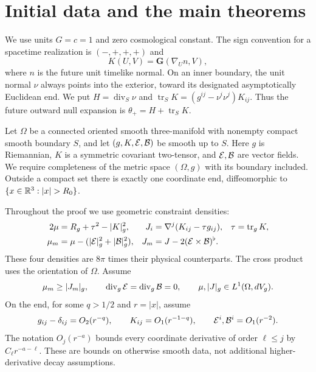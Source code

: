 \section{Initial data and the main theorems}\label{sec:statements}

We use units $G=c=1$ and zero cosmological constant. The sign convention
for a spacetime realization is $(-,+,+,+)$ and
\[
 K(U,V)=\mathbf G(\nabla_U n,V),
\]
where $n$ is the future unit timelike normal. On an inner boundary, the
unit normal $\nu$ always points into the exterior, toward its designated
asymptotically Euclidean end. We put $H=\operatorname{div}_S\nu$ and
$\operatorname{tr}_S K=(g^{ij}-\nu^i\nu^j)K_{ij}$. Thus the future outward
null expansion is $\theta_+=H+\operatorname{tr}_S K$.

\begin{definition}\label{def:data}
Let $\Omega$ be a connected oriented smooth three-manifold with nonempty
compact smooth boundary $S$, and let $(g,K,\mathcal E,\mathcal B)$ be smooth up to $S$.
Here $g$ is Riemannian, $K$ is a symmetric covariant two-tensor, and
$\mathcal E,\mathcal B$ are vector fields. We require completeness of the metric space
$(\Omega,g)$ with its boundary included. Outside a compact set there is
exactly one coordinate end, diffeomorphic to
$\{x\in\R^3:|x|>R_0\}$.

Throughout the proof we use geometric constraint densities:
\begin{align}
 2\mu&=R_g+\tau^2-|K|_g^2, &
 J_i&=\nabla^j(K_{ij}-\tau g_{ij}), &\tau&=\operatorname{tr}_gK,
 \label{eq:constraints}\\
 \mu_m&=\mu-(|\mathcal E|_g^2+|\mathcal B|_g^2), &
 J_m&=J-2(\mathcal E\times\mathcal B)^\flat.&&
 \label{eq:matter}
\end{align}
These four densities are $8\pi$ times their physical counterparts.
The cross product uses the orientation of $\Omega$. Assume
\begin{equation}\label{eq:charged-dec}
 \mu_m\ge |J_m|_g,\qquad
 \operatorname{div}_g\mathcal E=\operatorname{div}_g\mathcal B=0,
 \qquad \mu,|J|_g\in L^1(\Omega,dV_g).
\end{equation}
On the end, for some $q>1/2$ and $r=|x|$, assume
\begin{equation}\label{eq:weak-decay}
 g_{ij}-\delta_{ij}=O_2(r^{-q}),\qquad
 K_{ij}=O_1(r^{-1-q}),\qquad
 \mathcal E^i,\mathcal B^i=O_1(r^{-2}).
\end{equation}
The notation $O_j(r^{-a})$ bounds every coordinate derivative of order
$\ell\le j$ by $C_\ell r^{-a-\ell}$. These are bounds on otherwise
smooth data, not additional higher-derivative decay assumptions.


\end{definition}
